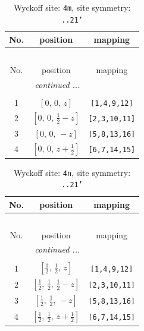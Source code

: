 \documentclass[fleqn,8pt]{jsarticle}
\begin{document}
\renewcommand{\arraystretch}{1.2}
\begin{longtable}{ccc}
\caption{Wyckoff site: {\tt 4m}, site symmetry: {\tt ..21'}}
 \\
 \hline \hline
No. & position & mapping \\ \hline \endfirsthead

\multicolumn{2}{l}{\tablename\ \thetable{}} \\
 \hline \hline
No. & position & mapping \\ \hline \endhead

 \hline \hline
\multicolumn{2}{r}{\footnotesize\it continued ...} \\ \endfoot

 \hline \hline
\multicolumn{2}{r}{} \\ \endlastfoot

1 & $\left[ 0,\, 0,\, z \right]$ & {\tt [1,4,9,12]} \\ \hline
2 & $\left[ 0,\, 0,\, \frac{1}{2} - z \right]$ & {\tt [2,3,10,11]} \\ \hline
3 & $\left[ 0,\, 0,\, - z \right]$ & {\tt [5,8,13,16]} \\ \hline
4 & $\left[ 0,\, 0,\, z + \frac{1}{2} \right]$ & {\tt [6,7,14,15]} \\
\end{longtable}
\renewcommand{\arraystretch}{1.2}
\begin{longtable}{ccc}
\caption{Wyckoff site: {\tt 4n}, site symmetry: {\tt ..21'}}
 \\
 \hline \hline
No. & position & mapping \\ \hline \endfirsthead

\multicolumn{2}{l}{\tablename\ \thetable{}} \\
 \hline \hline
No. & position & mapping \\ \hline \endhead

 \hline \hline
\multicolumn{2}{r}{\footnotesize\it continued ...} \\ \endfoot

 \hline \hline
\multicolumn{2}{r}{} \\ \endlastfoot

1 & $\left[ \frac{1}{2},\, \frac{1}{2},\, z \right]$ & {\tt [1,4,9,12]} \\ \hline
2 & $\left[ \frac{1}{2},\, \frac{1}{2},\, \frac{1}{2} - z \right]$ & {\tt [2,3,10,11]} \\ \hline
3 & $\left[ \frac{1}{2},\, \frac{1}{2},\, - z \right]$ & {\tt [5,8,13,16]} \\ \hline
4 & $\left[ \frac{1}{2},\, \frac{1}{2},\, z + \frac{1}{2} \right]$ & {\tt [6,7,14,15]} \\
\end{longtable}
\end{document}
